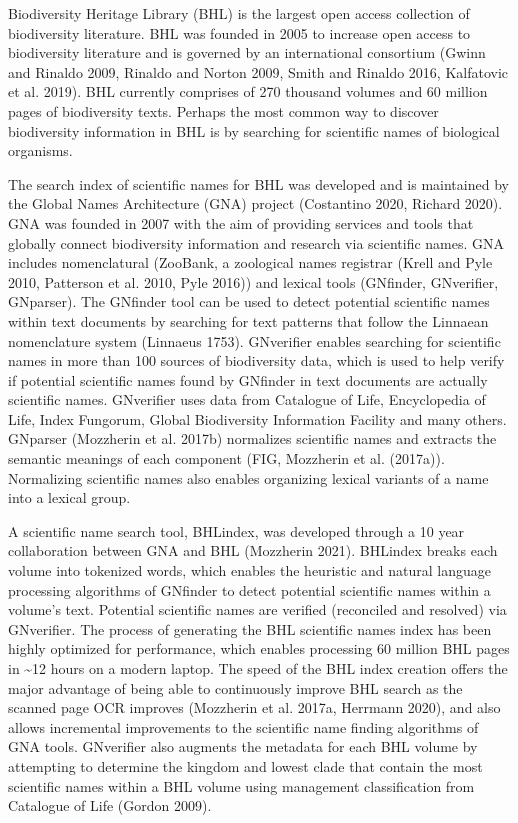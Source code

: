 \documentclass[
]{article}
\begin{document}
Biodiversity Heritage Library (BHL) is the largest open access
collection of biodiversity literature. BHL was founded in 2005 to
increase open access to biodiversity literature and is governed by an
international consortium (Gwinn and Rinaldo 2009, Rinaldo and Norton
2009, Smith and Rinaldo 2016, Kalfatovic et al. 2019). BHL currently
comprises of 270 thousand volumes and 60 million pages of biodiversity
texts. Perhaps the most common way to discover biodiversity information
in BHL is by searching for scientific names of biological organisms.

The search index of scientific names for BHL was developed and is
maintained by the Global Names Architecture (GNA) project (Costantino
2020, Richard 2020). GNA was founded in 2007 with the aim of providing
services and tools that globally connect biodiversity information and
research via scientific names. GNA includes nomenclatural (ZooBank, a
zoological names registrar (Krell and Pyle 2010, Patterson et al. 2010,
Pyle 2016)) and lexical tools (GNfinder, GNverifier, GNparser). The
GNfinder tool can be used to detect potential scientific names within
text documents by searching for text patterns that follow the Linnaean
nomenclature system (Linnaeus 1753). GNverifier enables searching for
scientific names in more than 100 sources of biodiversity data, which is
used to help verify if potential scientific names found by GNfinder in
text documents are actually scientific names. GNverifier uses data from
Catalogue of Life, Encyclopedia of Life, Index Fungorum, Global
Biodiversity Information Facility and many others. GNparser (Mozzherin
et al. 2017b) normalizes scientific names and extracts the semantic
meanings of each component (FIG, Mozzherin et al. (2017a)). Normalizing
scientific names also enables organizing lexical variants of a name into
a lexical group.

A scientific name search tool, BHLindex, was developed through a 10 year
collaboration between GNA and BHL (Mozzherin 2021). BHLindex breaks each
volume into tokenized words, which enables the heuristic and natural
language processing algorithms of GNfinder to detect potential
scientific names within a volume's text. Potential scientific names are
verified (reconciled and resolved) via GNverifier. The process of
generating the BHL scientific names index has been highly optimized for
performance, which enables processing 60 million BHL pages in
\textasciitilde12 hours on a modern laptop. The speed of the BHL index
creation offers the major advantage of being able to continuously
improve BHL search as the scanned page OCR improves (Mozzherin et al.
2017a, Herrmann 2020), and also allows incremental improvements to the
scientific name finding algorithms of GNA tools. GNverifier also
augments the metadata for each BHL volume by attempting to determine the
kingdom and lowest clade that contain the most scientific names within a
BHL volume using management classification from Catalogue of Life
(Gordon 2009).
\end{document}
